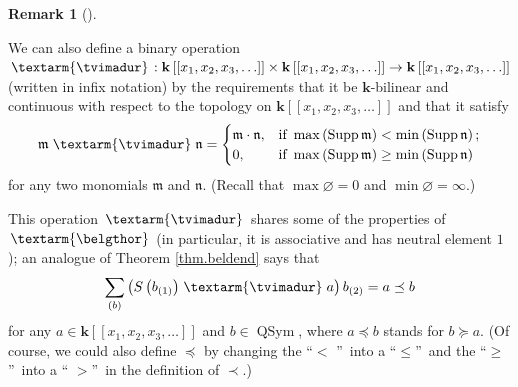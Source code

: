 \documentclass[numbers=enddot,12pt,final,onecolumn,notitlepage,abstracton]{scrartcl}%
\theoremstyle{definition}
\newtheorem{remk}[theo]{Remark}
\newenvironment{remark}[1][]
{\begin{remk}[#1]\begin{leftbar}}
{\end{leftbar}\end{remk}}
\newenvironment{vershort}{}{}
\newcommand{\tvi}{\left. \textarm{\tvimadur} \right.}
\newcommand{\bel}{\left. \textarm{\belgthor} \right.}
\let\sumnonlimits\sum
\renewcommand{\sum}{\sumnonlimits\limits}
\begin{document}
\begin{vershort}
\begin{remark}
We can also define a binary operation $\tvi
:\mathbf{k}\left[  \left[  x_{1},x_{2},x_{3},\ldots\right]  \right]
\times\mathbf{k}\left[  \left[  x_{1},x_{2},x_{3},\ldots\right]  \right]
\rightarrow\mathbf{k}\left[  \left[  x_{1},x_{2},x_{3},\ldots\right]  \right]
$ (written in infix notation) by the requirements that it be $\mathbf{k}%
$-bilinear and continuous with respect to the topology on $\mathbf{k}\left[
\left[  x_{1},x_{2},x_{3},\ldots\right]  \right]  $ and that it satisfy%
\[
\mathfrak{m}\tvi \mathfrak{n}=
\begin{cases}
\mathfrak{m}\cdot\mathfrak{n}, & \text{if }\max\left(  \operatorname*{Supp}%
\mathfrak{m}\right)  <\min\left(  \operatorname*{Supp}\mathfrak{n}\right)  ;\\
0, & \text{if }\max\left(  \operatorname*{Supp}\mathfrak{m}\right)  \geq
\min\left(  \operatorname*{Supp}\mathfrak{n}\right)
\end{cases}
\]
for any two monomials $\mathfrak{m}$ and $\mathfrak{n}$. (Recall that
$\max\varnothing=0$ and $\min\varnothing=\infty$.)

This operation $\tvi $ shares some of the properties of $\bel $ (in
particular, it is associative and has neutral element $1$); an analogue of
Theorem \ref{thm.beldend} says that
\[
\sum_{\left(  b\right)  }\left(  S\left(  b_{\left(  1\right)  }\right)
\tvi a\right)  b_{\left(  2\right)  }=a\left.  \preceq\right.  b
\]
for any $a\in\mathbf{k}\left[  \left[  x_{1},x_{2},x_{3},\ldots\right]
\right]  $ and $b\in\operatorname*{QSym}$, where $a\left.  \preceq\right.  b$
stands for $b\left.  \succeq\right.  a$. (Of course, we could also define
$\left.  \preceq\right.  $ by changing the \textquotedblleft$<$%
\textquotedblright\ into a \textquotedblleft$\leq$\textquotedblright\ and the
\textquotedblleft$\geq$\textquotedblright\ into a \textquotedblleft%
$>$\textquotedblright\ in the definition of $\left.  \prec\right.  $.)
\end{remark}
\end{vershort}
\end{document}
